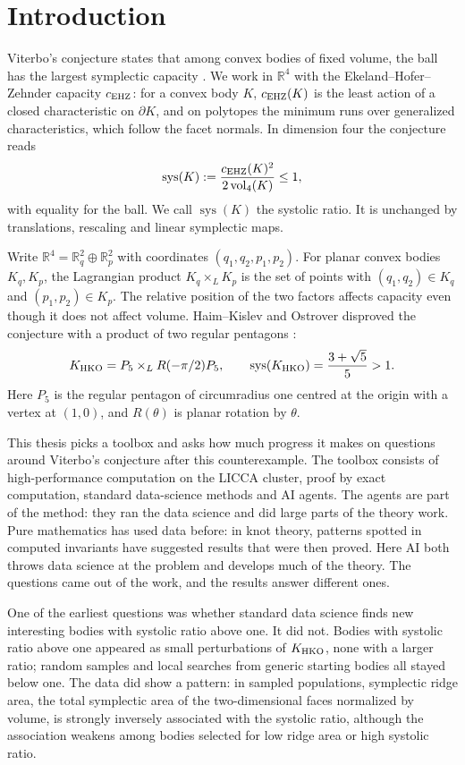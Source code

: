 \section{Introduction}\label{sec:introduction}

Viterbo's conjecture states that among convex bodies of fixed volume, the
ball has the largest symplectic capacity \cite{Viterbo2000}. We work in
$\mathbb R^4$ with the Ekeland--Hofer--Zehnder capacity $c_{\rm EHZ}$: for
a convex body $K$, $c_{\rm EHZ}(K)$ is the least action of a closed
characteristic on $\partial K$, and on polytopes the minimum runs over
generalized characteristics, which follow the facet normals. In dimension
four the conjecture reads
\[
 \operatorname{sys}(K):=\frac{c_{\rm EHZ}(K)^2}{2\operatorname{vol}_4(K)}\leq1,
\]
with equality for the ball. We call $\operatorname{sys}(K)$ the systolic
ratio. It is unchanged by translations, rescaling and linear symplectic
maps.

Write $\mathbb R^4=\mathbb R^2_q\oplus\mathbb R^2_p$ with coordinates
$(q_1,q_2,p_1,p_2)$. For planar convex bodies $K_q,K_p$, the Lagrangian
product $K_q\times_L K_p$ is the set of points with $(q_1,q_2)\in K_q$ and
$(p_1,p_2)\in K_p$. The relative position of the two factors affects
capacity even though it does not affect volume. Haim--Kislev and Ostrover
disproved the conjecture with a product of two regular pentagons
\cite{HaimKislevOstrover2024}:
\[
 K_{\rm HKO}=P_5\times_L R(-\pi/2)P_5,\qquad
 \operatorname{sys}(K_{\rm HKO})=\frac{3+\sqrt5}{5}>1.
\]
Here $P_5$ is the regular pentagon of circumradius one centred at the origin
with a vertex at $(1,0)$, and $R(\theta)$ is planar rotation by $\theta$.

This thesis picks a toolbox and asks how much progress it makes on questions
around Viterbo's conjecture after this counterexample. The toolbox consists
of high-performance computation on the LICCA cluster, proof by exact
computation, standard data-science methods and AI agents. The agents are
part of the method: they ran the data science and did large parts of the
theory work. Pure mathematics has used data before: in knot theory,
patterns spotted in computed invariants have suggested results that were
then proved. Here AI both throws data science at the problem and develops
much of the theory. The questions came out of the work, and the results
answer different ones.

One of the earliest questions was whether standard data science finds new
interesting bodies with systolic ratio above one. It did not. Bodies with
systolic ratio above one appeared as small perturbations of $K_{\rm HKO}$,
none with a larger ratio; random samples and local searches from generic
starting bodies all stayed below one. The data did show a pattern: in
sampled populations, symplectic ridge area, the total symplectic area of the
two-dimensional faces normalized by volume, is strongly inversely associated
with the systolic ratio, although the association weakens among bodies
selected for low ridge area or high systolic ratio.

